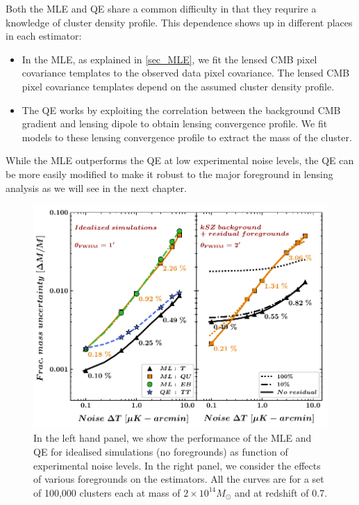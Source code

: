 Both the MLE and QE share a common difficulty in that they requrire a knowledge of cluster density profile.
This dependence shows up in different places in each estimator:
 \begin{itemize}
 \item In the MLE, as explained in \ref{sec_MLE}, we fit the lensed CMB pixel covariance templates to the observed data pixel covariance. The lensed CMB pixel covariance templates depend on the assumed cluster density profile.
 \item The QE works by exploiting the correlation between the background CMB gradient and lensing dipole to obtain lensing convergence profile. 
 We fit models to these lensing convergence profile to extract the mass of the cluster.
 
 \end{itemize}
While the MLE outperforms the QE at low experimental noise levels, the QE can be more easily modified to make it robust to the major foreground in lensing analysis as we will see in the next chapter.
 \begin{figure}[t]
\includegraphics[]{figs/fig1-eps-converted-to.pdf}
 \caption{In the left hand panel, we show the performance of the MLE and QE for idealised simulations (no foregrounds) as function of experimental noise levels. In the right panel, we consider the effects of various foregrounds on the estimators. All the curves are for a set of 100,000 clusters each at mass of $2\times 10^{14} M_{\odot}$ and at redshift of 0.7.}
 \label{fig_performance}
 \end{figure}
   
